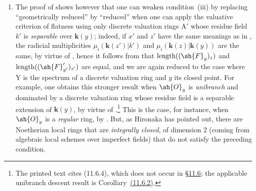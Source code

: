 \begin{remarks}[15.2.4]
\begin{enumerate}[label=(\roman*)]
To construct the rings $\mathrm{A}$ and $\mathrm{A}'$, let us start from an imperfect field $k$ of characteristic $p>0$; let $\mathrm{K}_0=k((\mathrm{T}))$ be the field of formal Laurent series over $k$, and let $\mathrm{A}_0$ be its valuation ring for the discrete valuation given by the order of a formal Laurent series; the residue field of $\mathrm{A}_0$ is thus $k$.
Let $\alpha$ be an element of $k$ that is not a $p$-th power, and let us take $k'=k(\alpha^{1/p})$; $\mathrm{K}=k'((\mathrm{T}))$ is then a finite radicial extension of $\mathrm{K}_0$, and $\mathrm{A}'=\mathrm{A}_0\otimes_k k'$ is the discrete valuation ring for $\mathrm{K}$.
If $\mathfrak{m}'$ is the maximal ideal of $\mathrm{A}'$, conditions~$1)$ and $2)$ are satisfied by taking $\mathrm{A}=\mathrm{A}_0+\mathfrak{m}'$: indeed, as $\mathrm{A}_0$ is Noetherian and $\mathrm{A}'$ is an $\mathrm{A}_0$-module of finite type, $\mathrm{A}$ is a finite $\mathrm{A}_0$-algebra, hence a Noetherian ring; since $\mathrm{A}'$ is finite over $\mathrm{A}$, $\mathfrak{m}'$ is the only maximal ideal of $\mathrm{A}$, which is thus a complete local ring, evidently of dimension $1$ (being finite over $\mathrm{A}_0$) and geometrically unibranch, since $\mathrm{A}'$ is integrally closed and has the same field of fractions $\mathrm{K}$ as $\mathrm{A}$.
  \item The proof of  shows however that one can weaken condition~(iii) by replacing ``geometrically reduced'' by ``reduced'' when one can apply the valuative criterion of flatness  using only discrete valuation rings $\mathrm{A}'$ whose residue field $k'$ is \emph{separable} over $\mathbf{k}(y)$; indeed, if $x'$ and $z'$ have the same meanings as in , the radicial multiplicities $\mu_i(\mathbf{k}(z')|k')$ and $\mu_i(\mathbf{k}(z)|\mathbf{k}(y))$ are the same, by virtue of , hence it follows from  that $\operatorname{length}((\sh{F}_y)_z)$ and $\operatorname{length}((\sh{F}_{y'}')_{z'})$ are equal, and we are again reduced to the case where $\mathrm{Y}$ is the spectrum of a discrete valuation ring and $y$ its closed point.
For example, one obtains this stronger result when $\sh{O}_y$ is \emph{unibranch} and dominated by a discrete valuation ring whose residue field is a separable extension of $\mathbf{k}(y)$, by virtue of .\footnote{The printed text cites (11.6.4), which does not occur in {\hyperlink{ega4.c04.subsec.11-6}{\S11.6}}; the applicable unibranch descent result is Corollary~{\hyperlink{ega4.c04.cor.11-6-2}{(11.6.2)}}.}
This is the case, for instance, when $\sh{O}_y$ is a \emph{regular} ring, by .
But, as Hironaka has pointed out, there are Noetherian local rings that are \emph{integrally closed}, of dimension $2$ (coming from algebraic local schemes over imperfect fields) that do not satisfy the preceding condition.
\end{enumerate}
\end{remarks}

